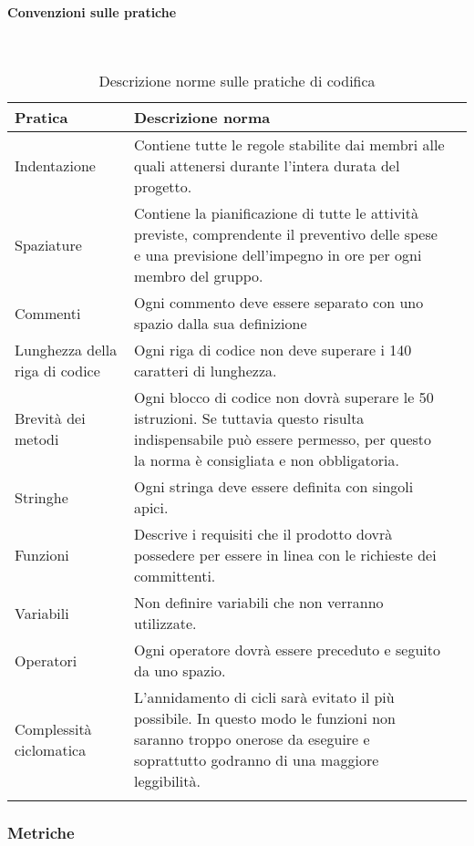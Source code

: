 \paragraph{Convenzioni sulle pratiche}
\
{
	\setlength{\freewidth}{\dimexpr\textwidth-0\tabcolsep}
	\renewcommand{\arraystretch}{1.5}
	\setlength{\aboverulesep}{0pt}
	\setlength{\belowrulesep}{0pt}
	\begin{longtable}{L{.210\freewidth} L{.6\freewidth} L{.080\freewidth}}
		\toprule 
		\textbf{Pratica} & \textbf{Descrizione norma} \\
		\toprule
		\endhead		
		Indentazione & Contiene tutte le regole stabilite dai membri alle quali attenersi durante l'intera durata del progetto. \\ 
		Spaziature & Contiene la pianificazione di tutte le attività previste, comprendente il preventivo delle spese e una previsione dell'impegno in ore per ogni membro del gruppo.  \\
		Commenti & Ogni commento deve essere separato con uno spazio dalla sua definizione \\ 
		Lunghezza della riga di codice & Ogni riga di codice non deve superare i 140 caratteri di lunghezza. \\
		Brevità dei metodi & Ogni blocco di codice non dovrà superare le 50 istruzioni. Se tuttavia questo risulta indispensabile può essere permesso, per questo la norma è consigliata e non obbligatoria.\\ 	
		Stringhe & Ogni stringa deve essere definita con singoli apici. \\
		Funzioni & Descrive i requisiti che il prodotto dovrà possedere per essere in linea con le richieste dei committenti.\\ 	
		Variabili & Non definire variabili che non verranno utilizzate.\\ 	
		Operatori & Ogni operatore dovrà essere preceduto e seguito da uno spazio.\\ 	
		Complessità ciclomatica & L'annidamento di cicli sarà evitato il più possibile. In questo modo le funzioni non saranno troppo onerose da eseguire e soprattutto godranno di una maggiore leggibilità. \\  			
		\bottomrule
		\hiderowcolors
		\caption{Descrizione norme sulle pratiche di codifica}
	\end{longtable}
}
\subsubsection{Metriche}
